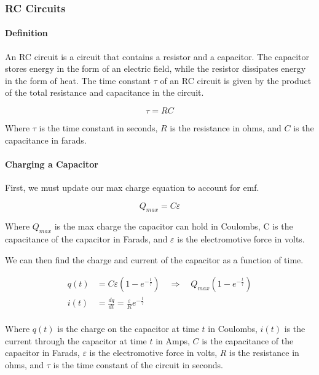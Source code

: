 \hrulefill

\subsubsection*{RC Circuits}

\paragraph*{Definition}
An RC circuit is a circuit that contains a resistor and a capacitor. The capacitor stores energy in the form of an electric field, 
while the resistor dissipates energy in the form of heat. The time constant $\tau$ of an RC circuit is given by the product of the 
total resistance and capacitance in the circuit.

\begin{equation*}
    \tau = RC
\end{equation*}

Where $\tau$ is the time constant in seconds, $R$ is the resistance in ohms, and $C$ is the capacitance in farads. 

\paragraph*{Charging a Capacitor}
First, we must update our max charge equation to account for emf.

\begin{equation*}
    Q_{max} = C\varepsilon
\end{equation*}

Where $Q_{max}$ is the max charge the capacitor can hold in Coulombs, C is the capacitance of the capacitor in Farads, and $\varepsilon$
is the electromotive force in volts.\\

\pagebreak

We can then find the charge and current of the capacitor as a function of time.

\begin{align*}
    q(t) &= C\varepsilon(1-e^{-\frac{t}{\tau}}) \quad \Rightarrow \quad Q_{max}(1-e^{-\frac{t}{\tau}})\\
    i(t) &= \frac{dq}{dt} = \frac{\varepsilon}{R}e^{-\frac{t}{\tau}}\\
\end{align*}

Where $q(t)$ is the charge on the capacitor at time $t$ in Coulombs, $i(t)$ is the current through the capacitor at time $t$ in Amps,
$C$ is the capacitance of the capacitor in Farads, $\varepsilon$ is the electromotive force in volts, $R$ is the resistance in ohms,
and $\tau$ is the time constant of the circuit in seconds.

